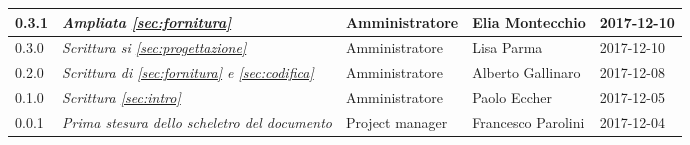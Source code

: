 \begin{table}[H]
\begin{tabular}{p{2cm}|C{4cm}|C{3cm}|C{3cm}|R{2cm}}
		0.3.1 & \emph{Ampliata \ref{sec:fornitura}}& Amministratore & Elia Montecchio & 2017-12-10 \\
		\hline
		
		0.3.0 & \emph{Scrittura si \ref{sec:progettazione}} & Amministratore & Lisa Parma & 2017-12-10 \\
		\hline
		
		0.2.0 & \emph{Scrittura di \ref{sec:fornitura} e \ref{sec:codifica}} & Amministratore & Alberto Gallinaro & 2017-12-08 \\
		\hline
		
		0.1.0 & \emph{Scrittura \ref{sec:intro}} & Amministratore & Paolo Eccher & 2017-12-05 \\
		\hline
		
		0.0.1 &\emph{Prima stesura dello scheletro del documento} &  Project manager & Francesco Parolini & 2017-12-04 \\
		
	

	\end{tabular}
	
\end{table}


\clearpage